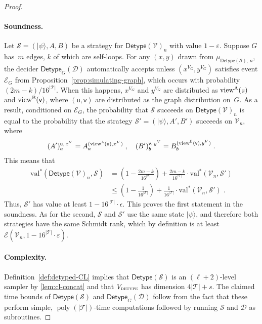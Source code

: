 \documentclass[11pt]{article}
\theoremstyle{definition}
\newcommand{\ket}[1]{|#1\rangle}
\DeclareMathOperator{\poly}{poly}
\newcommand{\val}{\ensuremath{\mathrm{val}}}
\newcommand{\eps}{\varepsilon}
\newcommand{\sampler}{\mathcal{S}}
\newcommand{\decider}{\mathcal{D}}
\newcommand{\verifier}{\mathcal{V}}
\newcommand{\strategy}{\mathscr{S}}
\newcommand{\type}{\mathcal{T}}
\newcommand{\gamestyle}[1]{\ensuremath{\textsc{#1}}\xspace}
\newcommand{\labelstyle}[1]{\ensuremath{\textsc{#1}}\xspace}
\newcommand{\tvarstyle}[1]{\mathsf{#1}}
\newcommand{\lvar}{\ensuremath{\tvarstyle{u}}}
\newcommand{\rvar}{\ensuremath{\tvarstyle{v}}}
\newcommand{\alice}{\labelstyle{A}}
\newcommand{\bob}{\labelstyle{B}}
\newcommand{\Ent}{\mathscr{E}}
\newcommand{\tmstyle}[1]{\ensuremath{\mathsf{#1}}}
\newcommand{\detype}{\tmstyle{Detype}}
\begin{document}
\begin{proof}
\paragraph{Soundness.}
Let $\strategy = (\ket{\psi}, A, B)$ be a strategy for $\detype(\verifier)_n$
with value $1-\eps$.
Suppose $G$ has~$m$ edges, $k$ of which are self-loops.
For any $(x, y)$ drawn from $\mu_{\detype(\sampler),\, n}$, the decider
$\detype_G(\decider)$ automatically accepts unless $(x^{V_G},y^{V_G})$ satisfies
event $\mathcal{E}_G$ from Proposition~\ref{prop:simulating-graph}, which occurs
with probability $(2m-k)/16^{|\type|}$.
When this happens, $x^{V_G}$ and $y^{V_G}$ are distributed as
$\mathrm{view}^\alice(\lvar)$ and $\mathrm{view}^\bob(\rvar)$, where $(\lvar,
\rvar)$ are distributed as the graph distribution on~$G$.
As a result, conditioned on $\mathcal{E}_G$, the probability that $\strategy$
succeeds on $\detype(\verifier)_n$ is equal to the probability that the strategy
$\strategy' = (\ket{\psi}, A', B')$ succeeds on $\verifier_n$, where
\begin{equation*}
  (A')^{\lvar,\, x^V}_a = A^{(\mathrm{view}^\alice(\lvar), x^V)}_a\;, \quad
  (B')^{\rvar,\, y^V}_b = B^{(\mathrm{view}^\bob(\rvar), y^V)}_b\;.
\end{equation*}
This means that
\begin{align*}
  \val^*(\detype(\verifier)_n, \strategy)
  & = \left(1 - \frac{2m-k}{16^{|\type|}}\right) +
    \frac{2m-k}{16^{|\type|}} \cdot \val^*(\verifier_n, \strategy')\\
  & \leq \left(1 - \frac{1}{16^{|\type|}}\right) +
    \frac{1}{16^{|\type|}} \cdot \val^*(\verifier_n, \strategy')\;.
\end{align*}
Thus, $\strategy'$ has value at least $1-16^{|\type|} \cdot \epsilon$.
This proves the first statement in the soundness.
As for the second, $\strategy$ and $\strategy'$ use the same state $\ket{\psi}$,
and therefore both strategies have the same Schmidt rank, which by definition is
at least $\Ent(\verifier_n,1 - 16^{|\type|} \cdot\eps)$.

\paragraph{Complexity.}
Definition~\ref{def:detyped-CL} implies that $\detype(\sampler)$ is an
$(\ell+2)$-level sampler by \cref{lem:cl-concat} and that
$V_{\gamestyle{detype}}$ has dimension $4|\type| + s$.
The claimed time bounds of $\detype(\sampler)$ and $\detype_G(\decider)$
follow from the fact that these perform simple, $\poly(|\type|)$-time
computations followed by running $\sampler$ and $\decider$ as subroutines.
\end{proof}
\end{document}
